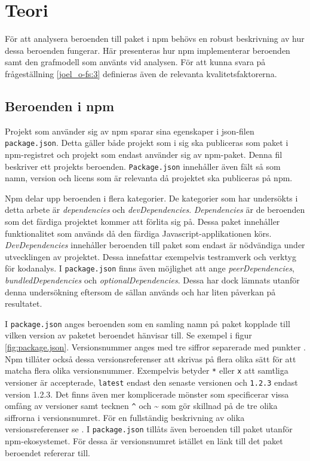 \section{Teori}
\label{sec:joel_o-theory}
För att analysera beroenden till paket i npm behövs en robust beskrivning av hur dessa beroenden fungerar. Här presenteras hur npm implementerar beroenden samt den grafmodell som använts vid analysen. För att kunna svara på frågeställning \ref{joel_o-fs:3} definieras även de relevanta kvalitetsfaktorerna.

\subsection{Beroenden i npm}
Projekt som använder sig av npm sparar sina egenskaper i json-filen \texttt{package.json}. Detta gäller både projekt som i sig ska publiceras som paket i npm-registret och projekt som endast använder sig av npm-paket. Denna fil beskriver ett projekts beroenden. \texttt{Package.json} innehåller även fält så som namn, version och licens som är relevanta då projektet ska publiceras på npm. \cite{npm-package.json}

Npm delar upp beroenden i flera kategorier. De kategorier som har undersökts i detta arbete är \textit{dependencies} och \textit{devDependencies}. \textit{Dependencies} är de beroenden som det färdiga projektet kommer att förlita sig på. Dessa paket innehåller funktionalitet som används då den färdiga Javascript-applikationen körs. \textit{DevDependencies} innehåller beroenden till paket som endast är nödvändiga under utvecklingen av projektet. Dessa innefattar exempelvis testramverk och verktyg för kodanalys. I \texttt{package.json} finns även möjlighet att ange \textit{peerDependencies}, \textit{bundledDependencies} och \textit{optionalDependencies}. Dessa har dock lämnats utanför denna undersökning eftersom de sällan används och har liten påverkan på resultatet.

I \texttt{package.json} anges beroenden som en samling namn på paket kopplade till vilken version av paketet beroendet hänvisar till. Se exempel i figur \ref{fig:package.json}. Versionsnummer anges med tre siffror separerade med punkter \cite{npm-semver}. Npm tillåter också dessa versionsreferenser att skrivas på flera olika sätt för att matcha flera olika versionsnummer. Exempelvis betyder \texttt{*} eller \texttt{x} att samtliga versioner är accepterade, \texttt{latest} endast den senaste versionen och \texttt{1.2.3} endast version 1.2.3. Det finns även mer komplicerade mönster som specificerar vissa omfång av versioner samt tecknen \texttt{\^} och {\textasciitilde} som gör skillnad på de tre olika siffrorna i versionsnumret. För en fullständig beskrivning av olika versionsreferenser se \cite{npm-semver}. I \texttt{package.json} tillåts även beroenden till paket utanför npm-ekosystemet. För dessa är versionsnumret istället en länk till det paket beroendet refererar till.


